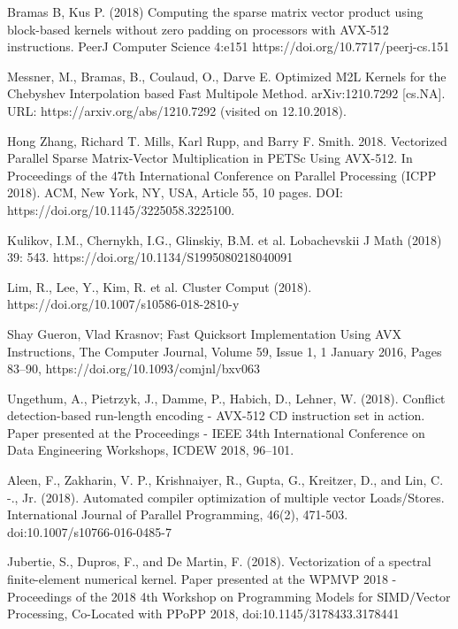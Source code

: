 \documentclass[
11pt,%
tightenlines,%
twoside,%
onecolumn,%
nofloats,%
nobibnotes,%
nofootinbib,%
superscriptaddress,%
noshowpacs,%
centertags]%
{revtex4}
\begin{document}
\begin{thebibliography}{99}
Bramas B, Kus P. (2018) Computing the sparse matrix vector product using block-based kernels without zero padding on processors with AVX-512 instructions. PeerJ Computer Science 4:e151 https://doi.org/10.7717/peerj-cs.151

Messner, M., Bramas, B., Coulaud, O., Darve E. Optimized M2L Kernels for the Chebyshev Interpolation based Fast Multipole Method. arXiv:1210.7292 [cs.NA]. URL: https://arxiv.org/abs/1210.7292 (visited on 12.10.2018).

Hong Zhang, Richard T. Mills, Karl Rupp, and Barry F. Smith. 2018. Vectorized Parallel Sparse Matrix-Vector Multiplication in PETSc Using AVX-512. In Proceedings of the 47th International Conference on Parallel Processing (ICPP 2018). ACM, New York, NY, USA, Article 55, 10 pages. DOI: https://doi.org/10.1145/3225058.3225100.

Kulikov, I.M., Chernykh, I.G., Glinskiy, B.M. et al. Lobachevskii J Math (2018) 39: 543. https://doi.org/10.1134/S1995080218040091

Lim, R., Lee, Y., Kim, R. et al. Cluster Comput (2018). https://doi.org/10.1007/s10586-018-2810-y

Shay Gueron, Vlad Krasnov; Fast Quicksort Implementation Using AVX Instructions, The Computer Journal, Volume 59, Issue 1, 1 January 2016, Pages 83–90, https://doi.org/10.1093/comjnl/bxv063

Ungethum, A., Pietrzyk, J., Damme, P., Habich, D., Lehner, W. (2018). Conflict detection-based run-length encoding - AVX-512 CD instruction set in action. Paper presented at the Proceedings - IEEE 34th International Conference on Data Engineering Workshops, ICDEW 2018, 96--101.

Aleen, F., Zakharin, V. P., Krishnaiyer, R., Gupta, G., Kreitzer, D., and Lin, C. -., Jr. (2018). Automated compiler optimization of multiple vector Loads/Stores. International Journal of Parallel Programming, 46(2), 471-503. doi:10.1007/s10766-016-0485-7

Jubertie, S., Dupros, F., and De Martin, F. (2018). Vectorization of a spectral finite-element numerical kernel. Paper presented at the WPMVP 2018 - Proceedings of the 2018 4th Workshop on Programming Models for SIMD/Vector Processing, Co-Located with PPoPP 2018, doi:10.1145/3178433.3178441


\end{thebibliography}
\end{document}
